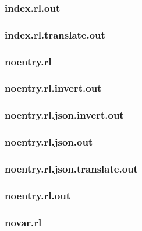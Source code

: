 \subsubsection{index.rl.out}
\label{app:index_rl.out}

\subsubsection{index.rl.translate.out}
\label{app:index_rl.translate.out}

\subsubsection{noentry.rl}
\label{app:noentry_rl}

\subsubsection{noentry.rl.invert.out}
\label{app:noentry_rl.invert.out}

\subsubsection{noentry.rl.json.invert.out}
\label{app:noentry_rl.json.invert.out}

\subsubsection{noentry.rl.json.out}
\label{app:noentry_rl.json.out}

\subsubsection{noentry.rl.json.translate.out}
\label{app:noentry_rl.json.translate.out}

\subsubsection{noentry.rl.out}
\label{app:noentry_rl.out}

\subsubsection{novar.rl}
\label{app:novar_rl}

